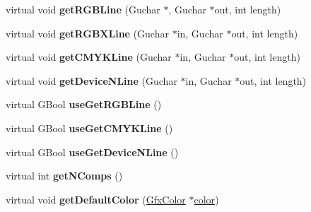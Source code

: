 \begin{DoxyCompactItemize}
\item 
\mbox{\label{class_gfx_device_c_m_y_k_color_space_a0d9498381bd5d3be44e726f9bd38252e}} 
virtual void {\bfseries get\+R\+G\+B\+Line} (Guchar $\ast$, Guchar $\ast$out, int length)
\item 
\mbox{\label{class_gfx_device_c_m_y_k_color_space_ab68ac825845c064c501b42ec0eba0879}} 
virtual void {\bfseries get\+R\+G\+B\+X\+Line} (Guchar $\ast$in, Guchar $\ast$out, int length)
\item 
\mbox{\label{class_gfx_device_c_m_y_k_color_space_a886fd594eb5ff4553f89c504ed138765}} 
virtual void {\bfseries get\+C\+M\+Y\+K\+Line} (Guchar $\ast$in, Guchar $\ast$out, int length)
\item 
\mbox{\label{class_gfx_device_c_m_y_k_color_space_a6b5d979fda3a3cfaf01b1b5a86dd588b}} 
virtual void {\bfseries get\+Device\+N\+Line} (Guchar $\ast$in, Guchar $\ast$out, int length)
\item 
\mbox{\label{class_gfx_device_c_m_y_k_color_space_aca5267cbe1f3f5ff25540b1e874f1aac}} 
virtual G\+Bool {\bfseries use\+Get\+R\+G\+B\+Line} ()
\item 
\mbox{\label{class_gfx_device_c_m_y_k_color_space_a64f8c67d6815638a1a8da17b9c220005}} 
virtual G\+Bool {\bfseries use\+Get\+C\+M\+Y\+K\+Line} ()
\item 
\mbox{\label{class_gfx_device_c_m_y_k_color_space_ac3b01006059a6ac4f1b878a66d349725}} 
virtual G\+Bool {\bfseries use\+Get\+Device\+N\+Line} ()
\item 
\mbox{\label{class_gfx_device_c_m_y_k_color_space_a1e4bfb0380adc3ca0e22453102ef1e98}} 
virtual int {\bfseries get\+N\+Comps} ()
\item 
\mbox{\label{class_gfx_device_c_m_y_k_color_space_a8bd6fba90b50d4e2a2422bb3872f7a1c}} 
virtual void {\bfseries get\+Default\+Color} (\hyperlink{struct_gfx_color}{Gfx\+Color} $\ast$\hyperlink{structcolor}{color})
\end{DoxyCompactItemize}
